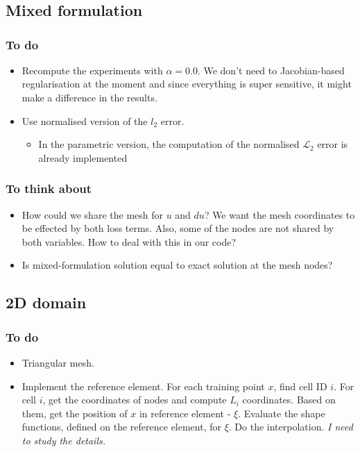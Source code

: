 \chapter[The 8$^{\text{th}}$ of March 2024]{}

\section{Mixed formulation}
\subsection{To do}
\begin{itemize}
    \item Recompute the experiments with $\alpha=0.0$. We don't need to Jacobian-based regularisation at the moment and since everything is super sensitive, it might make a difference in the results.
    \item Use normalised version of the $l_2$ error.
    \begin{itemize}
        \item In the parametric version, the computation of the normalised $\mathcal{L}_2$ error is already implemented
    \end{itemize}
\end{itemize}

\subsection{To think about}
\begin{itemize}
    \item How could we share the mesh for $u$ and $du$? We want the mesh coordinates to be effected by both loss terms. Also, some of the nodes are not shared by both variables. How to deal with this in our code?
    \item Is mixed-formulation solution equal to exact solution at the mesh nodes?
\end{itemize}

\section{2D domain }
\subsection{To do}
\begin{itemize}
    \item Triangular mesh. 
    \item Implement the reference element. For each training point $x$, find cell ID $i$. For cell $i$, get the coordinates of nodes and compute $L_i$ coordinates. Based on them, get the position of $x$ in reference element - $\xi$. Evaluate the shape functions, defined on the reference element, for $\xi$. Do the interpolation. \emph{I need to study the details. }
    
\end{itemize}


